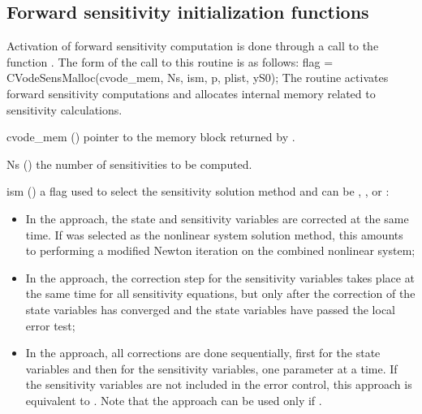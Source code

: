 \subsection{Forward sensitivity initialization functions}
\label{ss:sensi_malloc}
Activation of forward sensitivity computation is done through a call to the
function .
The form of the call to this routine is as follows:
{
  flag = CVodeSensMalloc(cvode\_mem, Ns, ism, p, plist, yS0);
}
{
  The routine  activates forward sensitivity computations and
  allocates internal memory related to sensitivity calculations.
}
{
  \begin{args}

  \item[cvode\_mem] ()
    pointer to the {\cvodes} memory block returned by .

  \item[Ns] () 
    the number of sensitivities to be computed.

  \item[ism] ()
    a flag used to select the sensitivity solution method and can 
    be , , or :
    \begin{itemize}
    \item In the  approach, the state and sensitivity variables are
      corrected at the same time. If  was selected as the nonlinear system 
      solution method, this amounts to performing a modified Newton iteration on the
      combined nonlinear system;
    \item In the  approach, the correction step for the sensitivity
      variables takes place at the same time for all sensitivity equations, but only after 
      the correction of the state variables has converged and the state variables 
      have passed the local error test; 
    \item In the  approach, all corrections are done sequentially, first
      for the state variables and then for the sensitivity variables, one parameter at
      a time. If the sensitivity variables are not included in the error control, this 
      approach is equivalent to . Note that the  approach 
      can be used only if .
    \end{itemize}


\end{args}}
